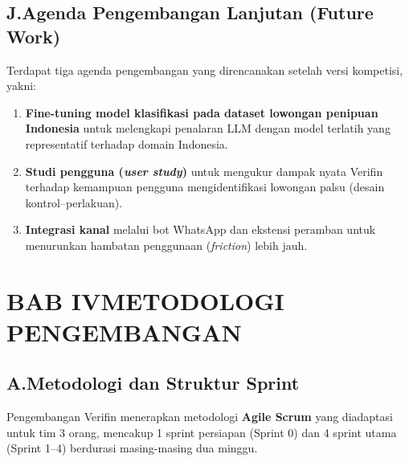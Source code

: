 \documentclass[12pt,a4paper]{article}
\begin{document}
\begin{blokkuning}
\subsection*{J.\quad Agenda Pengembangan Lanjutan (Future Work)}
Terdapat tiga agenda pengembangan yang direncanakan setelah versi kompetisi, yakni:
\begin{enumerate}[label=\textbf{\arabic*.}]
\item \textbf{Fine-tuning model klasifikasi pada dataset lowongan penipuan Indonesia} untuk
melengkapi penalaran LLM dengan model terlatih yang representatif terhadap domain Indonesia.
\item \textbf{Studi pengguna (\textit{user study})} untuk mengukur dampak nyata Verifin terhadap kemampuan pengguna
mengidentifikasi lowongan palsu (desain kontrol--perlakuan).
\item \textbf{Integrasi kanal} melalui bot WhatsApp dan ekstensi peramban untuk menurunkan hambatan penggunaan
(\textit{friction}) lebih jauh.
\end{enumerate}


\end{blokkuning}

\section*{BAB IV\quad METODOLOGI PENGEMBANGAN}

\subsection*{A.\quad Metodologi dan Struktur Sprint}

Pengembangan Verifin menerapkan metodologi \textbf{Agile Scrum} yang diadaptasi untuk tim 3 orang, mencakup 1 sprint persiapan (Sprint 0) dan 4 sprint utama (Sprint 1--4) berdurasi masing-masing dua minggu.
\end{document}
